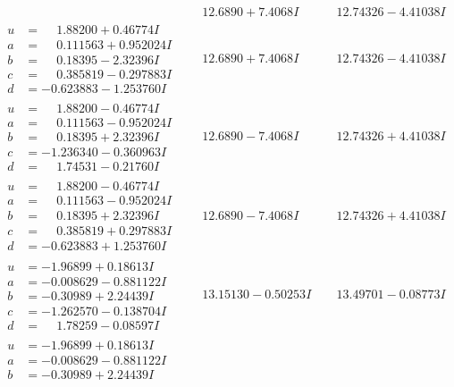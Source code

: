 \documentclass[1p]{elsarticle_modified}
\theoremstyle{definition}
\begin{document}
$$\begin{array}{c|c|c}
 & \phantom{-}12.6890 + 7.4068 I & \phantom{-}12.74326 - 4.41038 I \\ \hline\begin{aligned}
u &= \phantom{-}1.88200 + 0.46774 I \\
a &= \phantom{-}0.111563 + 0.952024 I \\
b &= \phantom{-}0.18395 - 2.32396 I \\
c &= \phantom{-}0.385819 - 0.297883 I \\
d &= -0.623883 - 1.253760 I\end{aligned}
 & \phantom{-}12.6890 + 7.4068 I & \phantom{-}12.74326 - 4.41038 I \\ \hline\begin{aligned}
u &= \phantom{-}1.88200 - 0.46774 I \\
a &= \phantom{-}0.111563 - 0.952024 I \\
b &= \phantom{-}0.18395 + 2.32396 I \\
c &= -1.236340 - 0.360963 I \\
d &= \phantom{-}1.74531 - 0.21760 I\end{aligned}
 & \phantom{-}12.6890 - 7.4068 I & \phantom{-}12.74326 + 4.41038 I \\ \hline\begin{aligned}
u &= \phantom{-}1.88200 - 0.46774 I \\
a &= \phantom{-}0.111563 - 0.952024 I \\
b &= \phantom{-}0.18395 + 2.32396 I \\
c &= \phantom{-}0.385819 + 0.297883 I \\
d &= -0.623883 + 1.253760 I\end{aligned}
 & \phantom{-}12.6890 - 7.4068 I & \phantom{-}12.74326 + 4.41038 I \\ \hline\begin{aligned}
u &= -1.96899 + 0.18613 I \\
a &= -0.008629 - 0.881122 I \\
b &= -0.30989 + 2.24439 I \\
c &= -1.262570 - 0.138704 I \\
d &= \phantom{-}1.78259 - 0.08597 I\end{aligned}
 & \phantom{-}13.15130 - 0.50253 I & \phantom{-}13.49701 - 0.08773 I \\ \hline\begin{aligned}
u &= -1.96899 + 0.18613 I \\
a &= -0.008629 - 0.881122 I \\
b &= -0.30989 + 2.24439 I \\

\end{aligned}
\end{array}$$
\end{document}

